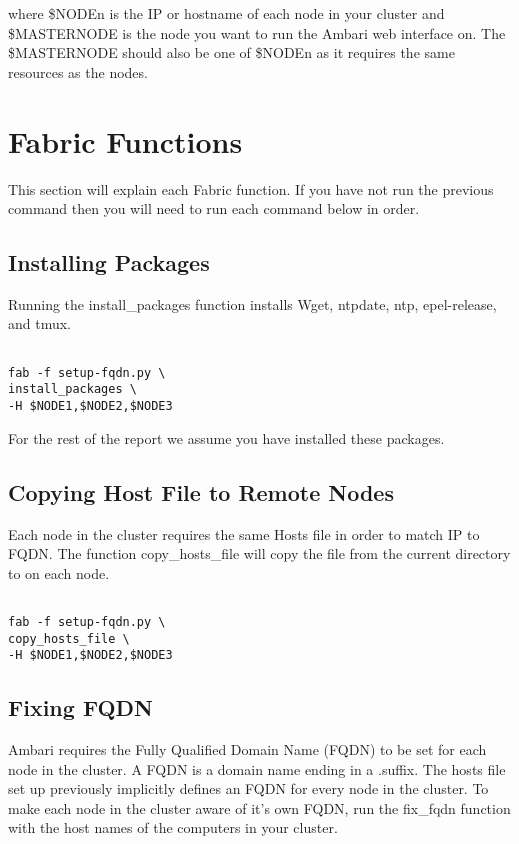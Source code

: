 \documentclass[9pt,twocolumn,twoside]{idsi}
\begin{document}
where \$NODEn is the IP or hostname of each node in your cluster and \$MASTERNODE is the node you want to run the Ambari web interface on. The \$MASTERNODE should also be one of \$NODEn as it requires the same resources as the nodes.




\section{Fabric Functions}
This section will explain each Fabric function. If you have not run the previous command then you will need to run each command below in order.

\subsection{Installing Packages}
Running the install\_packages function installs Wget, ntpdate, ntp, epel-release, and tmux.

\begin{verbatim}

fab -f setup-fqdn.py \
install_packages \
-H $NODE1,$NODE2,$NODE3

\end{verbatim}

For the rest of the report we assume you have installed these packages.

\subsection{Copying Host File to Remote Nodes}
Each node in the cluster requires the same Hosts file in order to match IP to FQDN.
The function copy\_hosts\_file will copy the file  from the current directory to  on each node.


\begin{verbatim}

fab -f setup-fqdn.py \
copy_hosts_file \
-H $NODE1,$NODE2,$NODE3

\end{verbatim}


\subsection{Fixing FQDN}
Ambari requires the Fully Qualified Domain Name (FQDN) to be set for each node in the cluster. A FQDN is a domain name ending in a .suffix. The hosts file set up previously implicitly defines an FQDN for every node in the cluster. To make each node in the cluster aware of it's own FQDN, run the fix\_fqdn function with the host names of the computers in your cluster.
\end{document}
